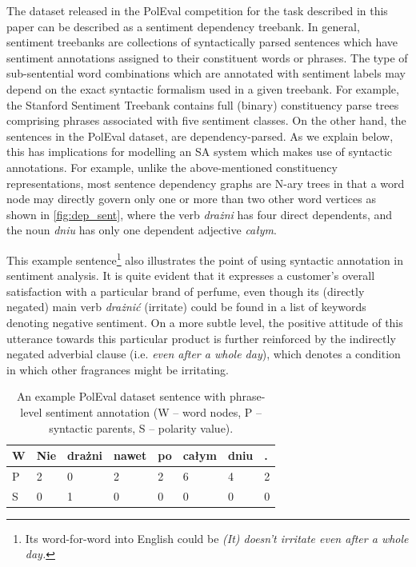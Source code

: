 \documentclass[10pt, a4paper]{article}
\begin{document}
The dataset released in the PolEval competition for the task described in this paper can be described as a sentiment dependency treebank. In general, sentiment treebanks are collections of syntactically parsed sentences which have sentiment annotations assigned to their constituent words or phrases. The type of sub-sentential word combinations which are annotated with  sentiment labels may depend on the exact syntactic formalism used in a given treebank. For example, the Stanford Sentiment Treebank \cite{socher2013recursive} contains full (binary) constituency parse trees comprising phrases associated with five sentiment classes. On the other hand, the sentences in the PolEval dataset, are dependency-parsed. As we explain below, this has implications for modelling an SA system which makes use of syntactic annotations. For example, unlike the above-mentioned constituency representations, most sentence dependency graphs are N-ary trees in that a word node may directly govern only one or more than two other word vertices as shown in \ref{fig:dep_sent}, where the verb \textit{drażni} has four direct dependents, and the noun \textit{dniu} has only one dependent adjective \textit{całym}. 
\par This example sentence\footnote{Its word-for-word into English could be \textit{(It) doesn't irritate even after a whole day.}} also illustrates the point of using syntactic annotation in sentiment analysis. It is quite evident that it expresses a customer's overall satisfaction with a particular brand of perfume, even though its (directly negated) main verb \textit{drażnić} (irritate) could be found in a list of keywords denoting negative sentiment. On a more subtle level, the positive attitude of this utterance towards this particular product is further reinforced by the indirectly negated adverbial clause (i.e. \textit{even after a whole day}), which denotes a condition in which other fragrances might be irritating.

\begin{table}[h]
 \begin{center}
\begin{tabular}{|l| l l l l l l l|}
      \hline
      W & Nie & drażni & nawet & po & całym & dniu & . \\
      \hline
      P & 2 & 0 & 2 & 2 & 6 & 4 & 2 \\
      \hline
      S & 0 & 1 & 0 & 0 & 0 & 0 & 0 \\
      \hline
\end{tabular}
\caption{An example PolEval dataset sentence with phrase-level sentiment annotation (W -- word nodes, P -- syntactic parents, S -- polarity value).}
\label{tab:nie_drazni_1}
 \end{center}
\end{table}
\end{document}
